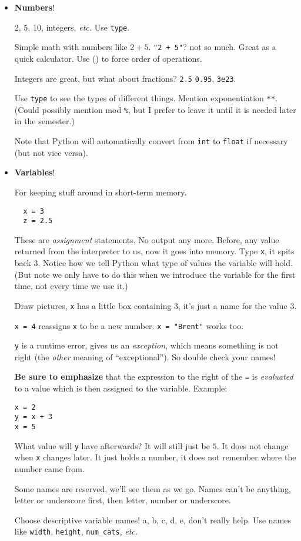 \documentclass{article}
\newcommand{\etc}{\emph{etc.}\xspace}
\begin{document}
\begin{itemize}
\item \textbf{Numbers}!

  2, 5, 10, integers, \etc  Use \texttt{type}.

  Simple math with numbers like $2+5$. \texttt{"2 + 5"}? not so much.
  Great as a quick calculator. Use () to force order of operations.

  Integers are great, but what about fractions? \texttt{2.5}
  \texttt{0.95}, \texttt{3e23}.

  Use \verb|type| to see the types of different things.  Mention
  exponentiation \verb|**|. (Could possibly mention mod \verb|%|, but
  I prefer to leave it until it is needed later in the semester.)

  Note that Python will automatically convert from \verb|int| to
  \verb|float| if necessary (but not vice versa).

\item \textbf{Variables}!

  For keeping stuff around in short-term memory.
\begin{verbatim}
  x = 3
  z = 2.5
\end{verbatim}
  These are \emph{assignment} statements.  No output any more. Before,
  any value returned from the interpreter to us, now it goes into
  memory.  Type \texttt{x}, it spits back 3.  Notice how we tell
  Python what type of values the variable will hold.  (But note we
  only have to do this when we introduce the variable for the first
  time, not every time we use it.)

  Draw pictures, \texttt{x} has a little box containing $3$, it's just a
  name for the value $3$.

  \texttt{x = 4} reassigns \texttt{x} to be a new number.  \texttt{x =
    "Brent"} works too.

  \texttt{y} is a runtime error, gives us an \emph{exception}, which
  means something is not right (the \emph{other} meaning of
  ``exceptional''). So double check your names!

  \textbf{Be sure to emphasize} that the expression to the right of
  the \texttt{=} is \emph{evaluated} to a value which is then assigned
  to the variable.  Example:
\begin{verbatim}
x = 2
y = x + 3
x = 5
\end{verbatim}
  What value will \texttt{y} have afterwards?  It will still just be
  $5$.  It does not change when \texttt{x} changes later.  It just
  holds a number, it does not remember where the number came from.

  Some names are reserved, we'll see them as we go.
  Names can't be anything, letter or underscore first, then letter,
  number or underscore.

  Choose descriptive variable names! a, b, c, d, e, don't really help.
  Use names like \texttt{width}, \texttt{height},
  \texttt{num\_cats}, \etc

\end{itemize}
\end{document}
